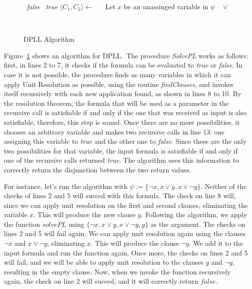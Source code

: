 \begin{figure}[t]
\begin{algorithmic}[1]
  \State \Return~\textit{false}
\EndIf
{}
  \State \Return~\textit{true}
\EndIf
{}
  \State $\langle C_{1}, C_{2} \rangle \gets$  
  \State~\Return~
\EndIf
\State Let $x$ be an unassinged variable in $\psi$
\State \Return~ $\vee$ 
\EndFunction
\end{algorithmic}
\caption{DPLL Algorithm}~\label{dpllAlgo}
\end{figure}

Figure~\ref{dpllAlgo} shows an algorithm for DPLL.\ The procedure \textit{SolvePL} works as follows: first, in lines 2 to 7, it checks if the formula can be evaluated to \textit{true} or \textit{false}. In case it is not possible, the procedure finds as many variables in which it can apply Unit Resolution as possible, using the routine \textit{findClauses}, and invokes itself recursively with each new application found, as shown in lines 8 to 10. By the resolution theorem, the formula that will be used as a parameter in the recursive call is satisfiable if and only if the one that was received as input is also satisfiable, therefore, this step is sound. Once there are no more possibilities, it chooses an arbitrary variable and makes two recursive calls in line 13: one assigning this variable to \textit{true} and the other one to \textit{false}. Since these are the only two possibilities for that variable, the input formula is satisfiable if and only if one of the recursive calls returned \textit{true}. The algorithm uses this information to correctly return the disjunction between the two return values.

For instance, let's run the algorithm with $\psi := \{\neg x, x \vee y, x \vee \neg y\}$. Neither of the
checks of lines 2 and 5 will succed with this formula. The check on line 8 will, since we can apply unit resolution on the first and second clauses, eliminating the variable $x$. This will produce the new clause $y$.
Following the algorithm, we apply the function $solvePL$ using $\{\neg x, x \vee y, x \vee \neg y, y\}$ as the
argument. The checks on lines 2 and 5 will fail again. We can apply unit resolution again using the clauses $\neg x$ and $x \vee \neg y$, eliminating $x$. This will produce the clause $\neg y$. We add it to the input formula
and run the function again. Once more, the checks on lines 2 and 5 will fail, and we will be able to apply
unit resolution to the clauses $y$ and $\neg y$, resulting in the empty clause. Now, when we invoke the function
recursively again, the check on line 2 will succed, and it will correctly return $false$.

